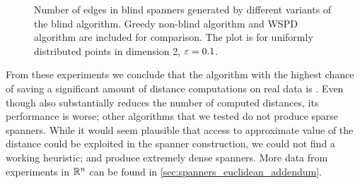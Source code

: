 \begin{figure}[!htbp]
    \begin{centering}
\end{centering}
    \caption{Number of edges in blind spanners generated by different variants of the blind
    algorithm. Greedy non-blind algorithm and WSPD algorithm are included for comparison. The plot is for uniformly distributed points
    in dimension 2, $\varepsilon = 0.1$.}
    \label{fig:spanner_sparseness}
\end{figure}



From these experiments we conclude that the algorithm with the highest chance
of saving a significant amount of distance computations on real data is \bgrdy. 
Even though \brndm also substantially reduces
the number of computed distances, its performance is worse;
other algorithms that we tested do not produce sparse spanners.
While it would seem plausible that access to approximate value of the distance
could be exploited in the spanner construction,
we could not find a working heuristic; \bqsgrdy and \bqsshaker produce extremely
dense spanners. More data from experiments in $\mathbb{R}^n$ can be found in
\cref{sec:spanners_euclidean_addendum}.

